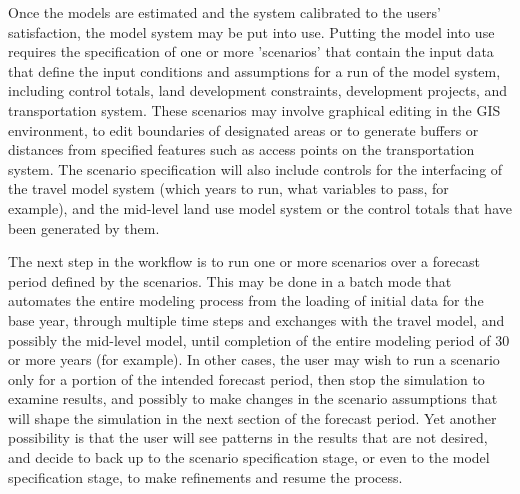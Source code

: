 Once the models are estimated and the system calibrated to the
users' satisfaction, the model system may be put into use. Putting
the model into use requires the specification of one or more
'scenarios' that contain the input data that define the input
conditions and assumptions for a run of the model system, including
control totals, land development constraints, development projects,
and transportation system.  These scenarios may involve graphical
editing in the GIS environment, to edit boundaries of designated
areas or to generate buffers or distances from specified features
such as access points on the transportation system.  The scenario
specification will also include controls for the interfacing of the
travel model system (which years to run, what variables to pass, for
example), and the mid-level land use model system or the control
totals that have been generated by them.

The next step in the workflow is to run one or more scenarios over a
forecast period defined by the scenarios.  This may be done in a
batch mode that automates the entire modeling process from the
loading of initial data for the base year, through multiple time
steps and exchanges with the travel model, and possibly the
mid-level model, until completion of the entire modeling period of
30 or more years (for example).  In other cases, the user may wish
to run a scenario only for a portion of the intended forecast
period, then stop the simulation to examine results, and possibly to
make changes in the scenario assumptions that will shape the
simulation in the next section of the forecast period.  Yet another
possibility is that the user will see patterns in the results that
are not desired, and decide to back up to the scenario specification
stage, or even to the model specification stage, to make refinements
and resume the process.

